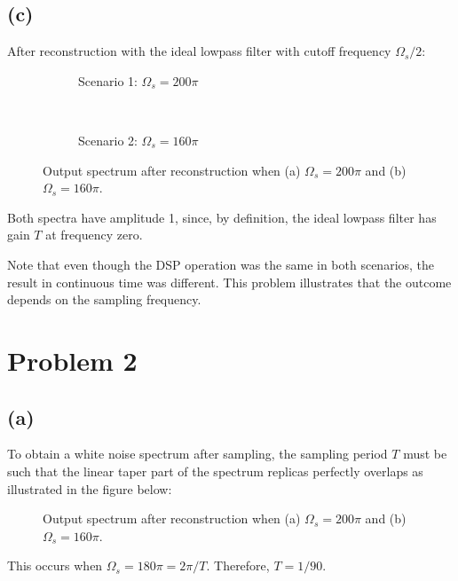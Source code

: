 \documentclass{article}
\begin{document}
\subsection{(c)}
After reconstruction with the ideal lowpass filter with cutoff frequency $\Omega_s/2$:

\begin{figure}[h!]
	\centering
	\begin{subfigure}[h!]{0.5\textwidth}
		\resizebox{\textwidth}{!}{}
		\caption{Scenario 1: $\Omega_s = 200\pi$}
	\end{subfigure}%
	~ %
	\begin{subfigure}[h!]{0.5\textwidth}
		\resizebox{\textwidth}{!}{}
		\caption{Scenario 2: $\Omega_s = 160\pi$}
	\end{subfigure}
	\caption{Output spectrum after reconstruction when (a) $\Omega_s = 200\pi$ and (b) $\Omega_s = 160\pi$.}
\end{figure}
	
Both spectra have amplitude 1, since, by definition, the ideal lowpass filter has gain $T$ at frequency zero.	
	
Note that even though the DSP operation was the same in both scenarios, the result in continuous time was different. This problem illustrates that the outcome depends on the sampling frequency.
	
\section{Problem 2}
\subsection{(a)}
To obtain a white noise spectrum after sampling, the sampling period $T$ must be such that the linear taper part of the spectrum replicas perfectly overlaps as illustrated in the figure below:

\begin{figure}[h!]
	\centering
	\resizebox{0.8\textwidth}{!}{}
	\caption{Output spectrum after reconstruction when (a) $\Omega_s = 200\pi$ and (b) $\Omega_s = 160\pi$.}
	\label{fig:linear_taper}
\end{figure}

This occurs when $\Omega_s = 180\pi = 2\pi/T$. Therefore, $T = 1/90$.
\end{document}
